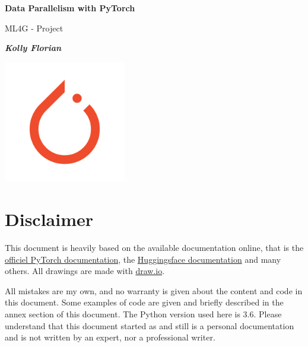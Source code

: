 \documentclass{article}
\begin{document}
\begin{titlepage}
  \begin{center}
    \vspace*{0.8in}
    \Huge
    \textbf{\textcolor{def}{Data Parallelism with PyTorch}}
    \vspace{0.8cm}

    \LARGE
    ML4G - Project

    \vspace{1.8cm}
    \Large
    \textbf{\emph{Kolly Florian}}
    \vspace{3cm}
  \end{center}
  \begin{center}
    \vspace{3cm}
    \includegraphics[width=0.4\textwidth]{images/pytorch-logo.png}
    \vspace{10cm}
  \end{center}
\end{titlepage}

\setlength{\parindent}{0em}
\setlength{\parskip}{0.2em}

\tableofcontents
\newpage

\section{Disclaimer}
This document is heavily based on the available documentation online, that is the \href{https://pytorch.org/docs/stable/index.html}{officiel PyTorch documentation}, the \href{https://huggingface.co/docs}{Huggingsface documentation} and many others. All drawings are made with \href{https://www.draw.io}{draw.io}.

All mistakes are my own, and no warranty is given about the content and code in this document. Some examples of code are given and briefly described in the annex section of this document. The Python version used here is 3.6. Please understand that this document started as and still is a personal documentation and is not written by an expert, nor a professional writer.
\end{document}
